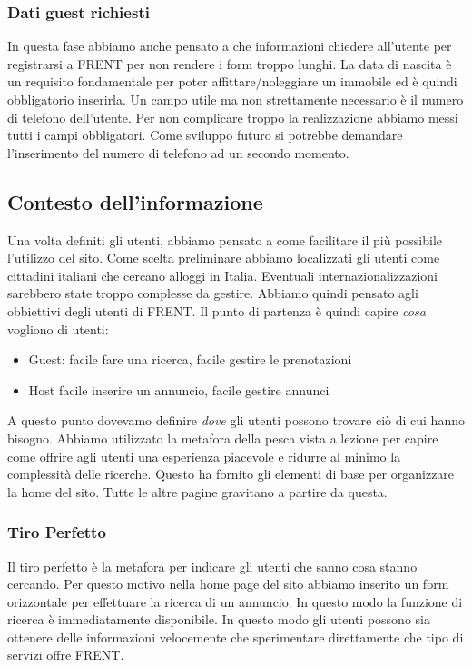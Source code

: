 \documentclass[1_relazione.tex]{subfiles}
\begin{document}
\subsubsection{Dati guest richiesti}
In questa fase abbiamo anche pensato a che informazioni chiedere all'utente per registrarsi a FRENT per non rendere i form troppo lunghi. La data di nascita è un requisito fondamentale per poter affittare/noleggiare un immobile ed è quindi obbligatorio inserirla. Un campo utile ma non strettamente necessario è il numero di telefono dell'utente. Per non complicare troppo la realizzazione abbiamo messi tutti i campi obbligatori. Come sviluppo futuro si potrebbe demandare l'inserimento del numero di telefono ad un secondo momento. 

\subsection{Contesto dell'informazione }
Una volta definiti gli utenti, abbiamo pensato a come facilitare il più possibile l'utilizzo del sito. Come scelta preliminare abbiamo localizzati gli utenti come cittadini italiani che cercano alloggi in Italia. Eventuali internazionalizzazioni sarebbero state troppo complesse da gestire. Abbiamo quindi pensato agli obbiettivi degli utenti di FRENT.  Il punto di partenza è quindi capire \textit{cosa} vogliono di utenti:

\begin{itemize}
\item Guest: facile fare una ricerca, facile gestire le prenotazioni 
\item Host facile inserire un annuncio, facile gestire annunci
\end{itemize}

A questo punto dovevamo definire \textit{dove} gli utenti possono trovare ciò di cui hanno bisogno. Abbiamo utilizzato la metafora della pesca vista a lezione per capire come offrire agli utenti una esperienza piacevole e ridurre al minimo la complessità delle ricerche. Questo ha fornito gli elementi di base per organizzare la home del sito. Tutte le altre pagine gravitano a partire da questa. 

\subsubsection{Tiro Perfetto} 
Il tiro perfetto è la metafora per indicare gli utenti che sanno cosa stanno cercando. Per questo motivo nella home page del sito abbiamo inserito un form orizzontale per effettuare la ricerca di un annuncio. In questo modo la funzione di ricerca è immediatamente disponibile. In questo modo gli utenti possono sia ottenere delle informazioni velocemente che sperimentare direttamente che tipo di servizi offre FRENT.
 
\end{document}
